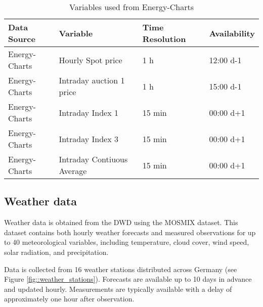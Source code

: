 \documentclass[class=scrbook, crop=false]{standalone}
\begin{document}

    
\begin{table}[]
\centering
\begin{tabular}{l|l|l|l}
 Data Source & Variable &  Time Resolution & Availability  \\\hline
 Energy-Charts & Hourly Spot price& 1 h& 12:00 d-1 \\
 Energy-Charts & Intraday auction 1 price & 1 h &  15:00 d-1\\
 Energy-Charts & Intraday Index 1 & 15 min &  00:00 d+1\\
 Energy-Charts & Intraday Index 3 & 15 min &  00:00 d+1\\
 Energy-Charts & Intraday Contiuous Average & 15 min &  00:00 d+1\\
   
\end{tabular}
\caption{Variables used from Energy-Charts}
\label{Table::Market_Data}
\end{table}

\subsection{Weather data}
\label{Section::Weather_Data}

Weather data is obtained from the \gls{DWD} using the \gls{MOSMIX} dataset. This dataset contains both hourly weather forecasts and measured observations for up to 40 meteorological variables, including temperature, cloud cover, wind speed, solar radiation, and precipitation.

Data is collected from 16 weather stations distributed across Germany (see Figure \ref{fig::weather_stations}). Forecasts are available up to 10 days in advance and updated hourly. Measurements are typically available with a delay of approximately one hour after observation.
\end{document}
